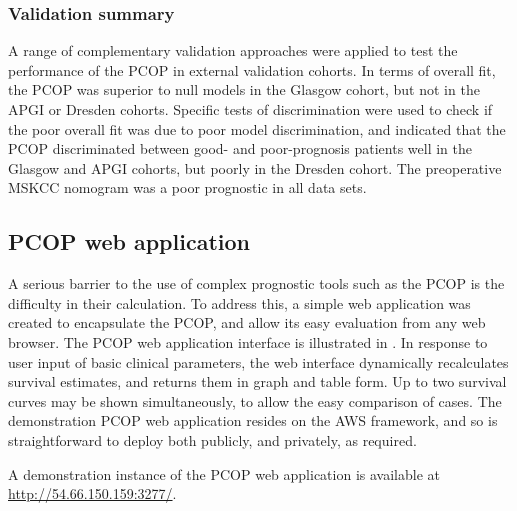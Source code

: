 \documentclass[dissertation.tex]{subfiles}
\begin{document}
\subsubsection{Validation summary}
A range of complementary validation approaches were applied to test the performance of the \gls{PCOP} in external validation cohorts.  In terms of overall fit, the \gls{PCOP} was superior to null models in the Glasgow cohort, but not in the \gls{APGI} or Dresden cohorts.  Specific tests of discrimination were used to check if the poor overall fit was due to poor model discrimination, and indicated that the \gls{PCOP} discriminated between good- and poor-prognosis patients well in the Glasgow and \gls{APGI} cohorts, but poorly in the Dresden cohort.  The preoperative \gls{MSKCC} nomogram was a poor prognostic in all data sets.

\subsection{PCOP web application}
A serious barrier to the use of complex prognostic tools such as the \gls{PCOP} is the difficulty in their calculation.  To address this, a simple web application was created to encapsulate the \gls{PCOP}, and allow its easy evaluation from any web browser.  The \gls{PCOP} web application interface is illustrated in .  In response to user input of basic clinical parameters, the web interface dynamically recalculates survival estimates, and returns them in graph and table form.  Up to two survival curves may be shown simultaneously, to allow the easy comparison of cases.  The demonstration \gls{PCOP} web application resides on the \gls{AWS} framework, and so is straightforward to deploy both publicly, and privately, as required.

A demonstration instance of the \gls{PCOP} web application is available at \url{http://54.66.150.159:3277/}.
\end{document}

